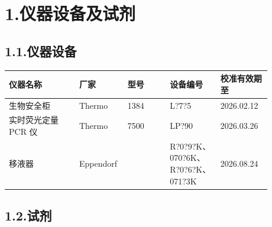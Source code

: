 \documentclass[UTF8,10pt,a4paper,fontset=fandol]{ctexart}
\newcommand{\fieldvalue}[1]{#1}
\newcommand{\handwritten}[1]{#1}
\begin{document}
\section*{1.\quad 仪器设备及试剂}

\subsection*{1.1.\quad 仪器设备}

\begin{center}
\small
\begin{tabular}{|p{0.25\linewidth}|p{0.12\linewidth}|p{0.15\linewidth}|p{0.18\linewidth}|p{0.18\linewidth}|}
\hline
\textbf{仪器名称} & \textbf{厂家} & \textbf{型号} & \textbf{设备编号} & \textbf{校准有效期至}\\
\hline
生物安全柜 & Thermo & 1384 &
\fieldvalue{\handwritten{L?7?5}}
&
\fieldvalue{\handwritten{2026.02.12}}
\\
\hline
实时荧光定量 PCR 仪 & Thermo & 7500 &
\fieldvalue{\handwritten{LP?90}}
&
\fieldvalue{\handwritten{2026.03.26}}
\\
\hline
移液器 & Eppendorf & 
&
\fieldvalue{\handwritten{R?0?9?K、070?6K、R?0?6?K、071?3K}}
&
\fieldvalue{\handwritten{2026.08.24}}
\\
\hline
\end{tabular}
\end{center}

\subsection*{1.2.\quad 试剂}
\end{document}
